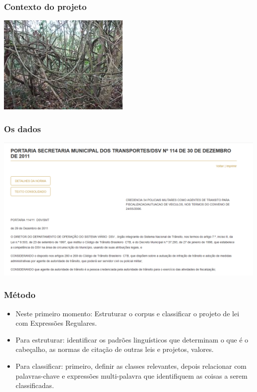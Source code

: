 \documentclass[11pt]{beamer}
\begin{document}
\begin{frame}
\frametitle{Contexto do projeto}
\includegraphics[width=\columnwidth,height=\textheight,keepaspectratio]{Cipoal.jpg}
\end{frame}
\begin{frame}
\frametitle{Os dados}
\includegraphics[width=\columnwidth,height=\textheight,keepaspectratio]{Lei_site.png}
\end{frame}
\begin{frame}
\frametitle{Método}
\begin{itemize}
	\item <1-> Neste primeiro momento: Estruturar o corpus e classificar o projeto de lei com Expressões Regulares.\\
	\item <2->Para estruturar: identificar os padrões linguísticos que determinam o que é o cabeçalho, as normas de citação de outras leis e projetos, valores.\\
	\item <3->Para classificar: primeiro, definir as classes relevantes, depois relacionar com palavras-chave e expressões multi-palavra que identifiquem as coisas a serem classificadas.\\
\end{itemize}
\end{frame}
\end{document}
